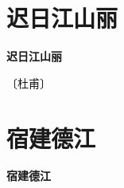 \documentclass[12pt,UTF-8,openany,fontset=none]{ctexbook}
\begin{document}
\vspace{8pt}
\clearpage


\section{迟日江山丽}



\begin{center}
    {\bfseries 迟日江山丽}
\end{center}

\begin{center}
    \vspace{10pt}
    
    \begin{large}
        
        〔杜甫〕
        
    \end{large}
    
    \vspace{8pt}
    
    \begin{huge}
        
        \phantom{。}

        \phantom{。}
        
        \phantom{。}

        \phantom{。}
        
    \end{huge}
    
\end{center}

\vspace{8pt}
\clearpage


\section{宿建德江}



\begin{center}
    {\bfseries 宿建德江}
\end{center}
\end{document}
